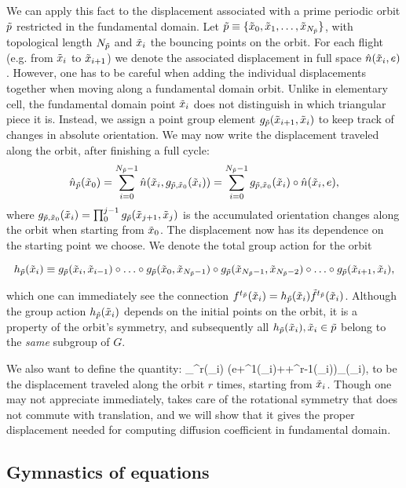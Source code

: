 \documentclass[aps,pre,
                showpacs,
                twocolumn,
                groupedaddress,
                floatfix]{revtex4-1}
\begin{document}
We can apply this fact to the displacement associated with a prime
periodic orbit ${\tilde p}$ restricted in the fundamental domain. Let
${\tilde p}\equiv\{\tilde x_0,\tilde x_1,\ldots,\tilde x_{N_{\tilde p}}\}$, with topological length
$N_{\tilde p}$ and $\tilde x_i$ the bouncing points on the orbit. For each flight
(e.g. from $\tilde x_i$ to $\tilde x_{i+1}$) we denote the associated
displacement in full space $\hat n(\tilde x_i, e)$. However, one has to be
careful when adding the individual displacements together when moving
along a fundamental domain orbit. Unlike in elementary cell, the
fundamental domain point $\tilde x_i$ does not distinguish in which
triangular piece it is. Instead, we assign a point group element
$g_{\tilde p}(\tilde x_{i+1},\tilde x_{i})$ to keep track of changes in absolute
orientation. We may now write the displacement traveled along the
orbit, after finishing a full cycle:
\[
\hat n_{{\tilde p}}(\tilde x_{0})=\sum_{i=0}^{N_{\tilde p}-1}\hat n(\tilde x_{i},g_{{\tilde p},\tilde x_0}(\tilde x_{i}))=\sum_{i=0}^{N_{\tilde p}-1}g_{{\tilde p},\tilde x_{0}}(\tilde x_{i})\circ\hat n(\tilde x_{i},e),
\]
where $g_{{\tilde p},\tilde x_{0}}(\tilde x_i)=\prod_0^{j-1} g_{\tilde p}(\tilde x_{j+1},\tilde x_{j})$
is the accumulated orientation changes along the orbit when starting
from $\tilde x_{0}$. The displacement now has its dependence on the
starting point we choose. We denote the total group action for the
orbit
\begin{widetext}
\[h_{{\tilde p}}(\tilde x_i)\equiv g_{\tilde p}(\tilde x_{i},\tilde x_{i-1})\circ\ldots\circ
g_{\tilde p}(\tilde x_{0},\tilde x_{N_{\tilde p}-1})\circ
g_{\tilde p}(\tilde x_{N_{\tilde p}-1},\tilde x_{N_{\tilde p}-2})\circ \ldots\circ
g_{\tilde p}(\tilde x_{i+1},\tilde x_{i}),\]
\end{widetext}
which one can immediately see the connection ${f^{t_{\tilde p}}(\tilde x_i)}=h_{{\tilde p}}(\tilde x_i){\tilde{f}^{t_{\tilde p}}(\tilde x_i)}$. Although the group action $h_{{\tilde p}}(\tilde x_i)$ depends on the initial points on the orbit, it is a property of the orbit's symmetry, and subsequently all $h_{{\tilde p}}(\tilde x_i), \tilde x_i\in {\tilde p}$ belong to the \emph{same} subgroup of $G$.

We also want to define the quantity:
\beq
{}_{\tp}^{r}(\tx_i)\equiv
(e+\hp^{1}(\tx_i)+\cdots+\hp^{r-1}(\tx_i))\cdot\hn_{\tp}(\tx_i),
\label{eq-fdDisplacement}
\eeq
to be the displacement traveled along the orbit $r$ times, starting from $\tilde x_i$.  Though one may not appreciate immediately,  takes care of the rotational symmetry that does not commute with translation, and we will show that it gives the proper displacement needed for computing diffusion coefficient in fundamental domain.


\subsection{Gymnastics of equations}
\end{document}
